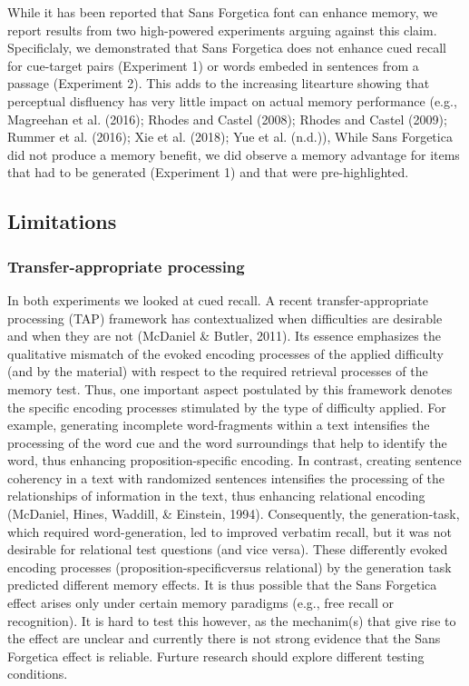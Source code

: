 \documentclass[english,doc]{apa6}
\begin{document}
While it has been reported that Sans Forgetica font can enhance memory, we report results from two high-powered experiments arguing against this claim. Specificlaly, we demonstrated that Sans Forgetica does not enhance cued recall for cue-target pairs (Experiment 1) or words embeded in sentences from a passage (Experiment 2). This adds to the increasing litearture showing that perceptual disfluency has very little impact on actual memory performance (e.g., Magreehan et al. (2016); Rhodes and Castel (2008); Rhodes and Castel (2009); Rummer et al. (2016); Xie et al. (2018); Yue et al. (n.d.)), While Sans Forgetica did not produce a memory benefit, we did observe a memory advantage for items that had to be generated (Experiment 1) and that were pre-highlighted.

\hypertarget{limitations}{%
\subsection{Limitations}\label{limitations}}

\hypertarget{transfer-appropriate-processing}{%
\subsubsection{Transfer-appropriate processing}\label{transfer-appropriate-processing}}

In both experiments we looked at cued recall. A recent transfer-appropriate processing (TAP) framework has contextualized when difficulties are desirable and when they are not (McDaniel \& Butler, 2011). Its essence emphasizes the qualitative mismatch of the evoked encoding processes of the applied difficulty (and by the material) with respect to the required retrieval processes of the memory test. Thus, one important aspect postulated by this framework denotes the specific encoding processes stimulated by the type of difficulty applied. For example, generating incomplete word-fragments within a text intensifies the processing of the word cue and the word surroundings that help to identify the word, thus enhancing proposition-specific encoding. In contrast, creating sentence coherency in a text with randomized sentences intensifies the processing of the relationships of information in the text, thus enhancing relational encoding (McDaniel, Hines, Waddill, \& Einstein, 1994). Consequently, the generation-task, which required word-generation, led to improved verbatim recall, but it was not desirable for relational test questions (and vice versa). These differently evoked encoding processes (proposition-specificversus relational) by the generation task predicted different memory effects. It is thus possible that the Sans Forgetica effect arises only under certain memory paradigms (e.g., free recall or recognition). It is hard to test this however, as the mechanim(s) that give rise to the effect are unclear and currently there is not strong evidence that the Sans Forgetica effect is reliable. Furture research should explore different testing conditions.
\end{document}
